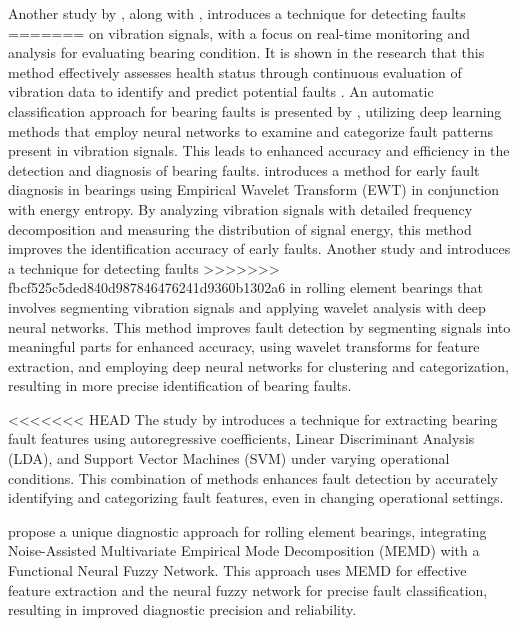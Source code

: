 \documentclass[sn-basic,pdflatex]{sn-jnl}
\theoremstyle{remark}
\theoremstyle{definition}
\begin{document}
Another study by \citet{WOS:000450745100001}, along with
\citet{WOS:000449334500118}, introduces a technique for detecting faults
=======
on vibration signals, with a focus on real-time monitoring and analysis
for evaluating bearing condition. It is shown in the research that this
method effectively assesses health status through continuous evaluation
of vibration data to identify and predict potential faults
\citep{WOS:000452922000015}. An automatic classification approach for
bearing faults is presented by \citet{WOS:000453413600001}, utilizing
deep learning methods that employ neural networks to examine and
categorize fault patterns present in vibration signals. This leads to
enhanced accuracy and efficiency in the detection and diagnosis of
bearing faults. \citet{WOS:000452819600235} introduces a method for
early fault diagnosis in bearings using Empirical Wavelet Transform
(EWT) in conjunction with energy entropy. By analyzing vibration signals
with detailed frequency decomposition and measuring the distribution of
signal energy, this method improves the identification accuracy of early
faults. Another study \citet{WOS:000450745100001} and
\citet{WOS:000449334500118} introduces a technique for detecting faults
>>>>>>> fbcf525c5ded840d987846476241d9360b1302a6
in rolling element bearings that involves segmenting vibration signals
and applying wavelet analysis with deep neural networks. This method
improves fault detection by segmenting signals into meaningful parts for
enhanced accuracy, using wavelet transforms for feature extraction, and
employing deep neural networks for clustering and categorization,
resulting in more precise identification of bearing faults.

<<<<<<< HEAD
The study by \citet{WOS:000440977000032} introduces a technique for
extracting bearing fault features using autoregressive coefficients,
Linear Discriminant Analysis (LDA), and Support Vector Machines (SVM)
under varying operational conditions. This combination of methods
enhances fault detection by accurately identifying and categorizing
fault features, even in changing operational settings.

\citet{WOS:000434717400001} propose a unique diagnostic approach for
rolling element bearings, integrating Noise-Assisted Multivariate
Empirical Mode Decomposition (MEMD) with a Functional Neural Fuzzy
Network. This approach uses MEMD for effective feature extraction and
the neural fuzzy network for precise fault classification, resulting in
improved diagnostic precision and reliability.
\end{document}
